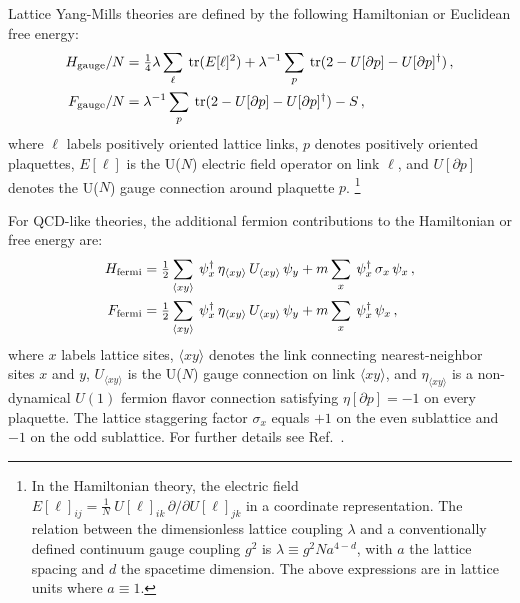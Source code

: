 \documentclass [12pt]{article}
\newcommand{\tr}{\mathop{\mathrm{tr}}}
\begin{document}
\setlength{\parskip}{3pt}

Lattice Yang-Mills theories are defined by the following Hamiltonian
or Euclidean free energy:
\begin{subequations}
\begin{align}
	H_{\rm gauge}/N &= \tfrac 14 \lambda \sum_\ell \> \tr (E[\ell]^2)
	    + \lambda^{-1} \sum_p \> \tr (2 - U[\partial p] - U[\partial p]^\dagger) \,,
    \\
	F_{\rm gauge}/N &= \lambda^{-1} \sum_p \> \tr (2 - U[\partial p] - U[\partial p]^\dagger)
	    - S \,,
\end{align}
\end{subequations}
where $\ell$ labels positively oriented lattice links,
$p$ denotes positively oriented plaquettes,
$E[\ell]$ is the U($N$) electric field operator on link $\ell$, and
$U[\partial p]$ denotes the U($N$) gauge connection around plaquette $p$.%
\footnote
    {
    In the Hamiltonian theory,
    the electric field 
    $
	E[\ell]_{ij} = \frac 1N \> U[\ell]_{ik} \,{\partial}\big/{\partial U[\ell]_{jk}}
    $
    in a coordinate representation.
    The relation between the dimensionless lattice coupling $\lambda$ and a
    conventionally defined continuum gauge coupling $g^2$ is
    $\lambda \equiv g^2 N a^{4-d}$, with $a$ the lattice spacing and $d$ the spacetime dimension.
    The above expressions are in lattice units where $a \equiv 1$.
    }

For QCD-like theories, the additional
fermion contributions to the Hamiltonian or free energy are:
\begin{subequations}\label{eq:fermidef}
\begin{align}
    H_{\rm fermi} &= \tfrac 12 \sum_{\langle xy \rangle} \>
	\psi^\dagger_x \, \eta_{\langle xy \rangle} \, U_{\langle xy \rangle} \, \psi_y
	+ m \sum_x \> \psi^\dagger_x \, \sigma_x \, \psi_x \,,
    \\
    F_{\rm fermi} &= \tfrac 12 \sum_{\langle xy \rangle} \>
	\psi^\dagger_x \, \eta_{\langle xy \rangle} \, U_{\langle xy \rangle} \, \psi_y
	+ m \sum_x \> \psi^\dagger_x \, \psi_x \,,
\end{align}
\end{subequations}
where $x$ labels lattice sites,
$\langle xy \rangle$ denotes the link connecting nearest-neighbor sites $x$ and $y$,
$U_{\langle xy \rangle}$ is the U($N$) gauge connection on link $\langle xy \rangle$,
and
$\eta_{\langle xy \rangle}$ is a non-dynamical $U(1)$ fermion flavor connection
satisfying $\eta[\partial p] = -1$ on every plaquette.
The lattice staggering factor
$\sigma_x$ equals $+1$ on the even sublattice and $-1$ on the odd sublattice.
For further details see Ref.~\cite{CSVAII}.
\end{document}
